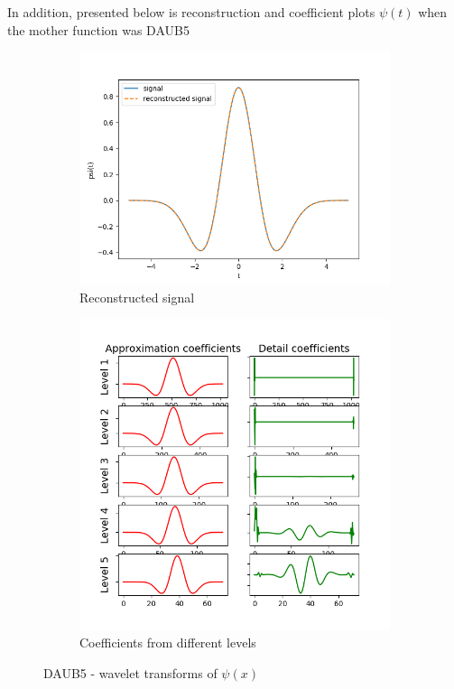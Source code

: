 \documentclass[12pt]{article}
\begin{document}
In addition, presented below is reconstruction and coefficient plots $\psi(t)$ when the mother function was DAUB5
\begin{figure}[h]
	\centering
	\begin{subfigure}[h]{0.40\textwidth}
		\centering
		\includegraphics[width=\textwidth]{wavelet_reconst_db5.png}
		\caption{Reconstructed signal}
	\end{subfigure}
	\begin{subfigure}[h]{0.40\textwidth}
		\centering
		\includegraphics[width=\textwidth]{Wavelet_coeff_db5.png}
		\caption{Coefficients from different levels}
	\end{subfigure}
	\caption{DAUB5 - wavelet transforms of $\psi(x)$}
\end{figure}
\end{document}
